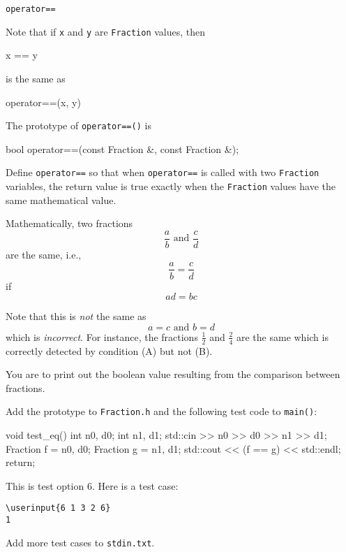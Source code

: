 \verb!operator==!

Note that if \verb!x! and \verb!y! are \verb!Fraction! values, then
\begin{console}
x == y
\end{console}
is the same as
\begin{console}
operator==(x, y)
\end{console}

The prototype of \verb!operator==()! is
\begin{console}
bool operator==(const Fraction &, const Fraction &);
\end{console}

Define \verb!operator==! so that when \verb!operator==! is called with two
\verb!Fraction! variables, the return value is true exactly when the
\verb!Fraction! values have the same mathematical value.

Mathematically, two fractions
\[
\frac{a}{b} \text{ \ \ \ and \ \ \ }
\frac{c}{d}
\]
are the same, i.e.,
\[
\frac{a}{b} =
\frac{c}{d}
\]
if
\[
ad = bc \tag{A}
\]

Note that this is \textit{not} the same as
\[
           a = c \text{ \ \ \ and \ \ \ } b = d
           \tag{B}
\]
which is \textit{incorrect}. For instance, the fractions $\frac{1}{2}$ and
$\frac{2}{4}$ are the same which is correctly detected by condition (A) but
not (B).

You are to print out the boolean value resulting from the comparison between
fractions.

Add the prototype to \verb!Fraction.h! and the following test code to
\verb!main()!:
\begin{console}[commandchars=\~\!\@]
void test_eq()
{
    int n0, d0;
    int n1, d1;
    std::cin >> n0 >> d0 >> n1 >> d1;
    Fraction f = {n0, d0};
    Fraction g = {n1, d1};
    std::cout << (f == g) << std::endl;
    return;
}
\end{console}
This is test option 6. Here is a test case:

\resett
\nextt
\begin{Verbatim}[frame=single, commandchars=\\\{\}]
\userinput{6 1 3 2 6}
1
\end{Verbatim}

Add more test cases to \verb!stdin.txt!.
